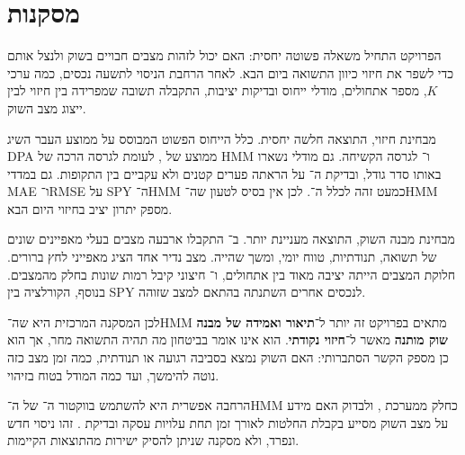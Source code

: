 \section{מסקנות}

הפרויקט התחיל משאלה פשוטה יחסית: האם  יכול לזהות מצבים חבויים בשוק ולנצל אותם כדי לשפר את חיזוי כיוון התשואה ביום הבא. לאחר הרחבת הניסוי לתשעה נכסים, כמה ערכי \(K\), מספר אתחולים, מודלי ייחוס ובדיקות יציבות, התקבלה תשובה שמפרידה בין חיזוי לבין ייצוג מצב השוק.

מבחינת חיזוי, התוצאה חלשה יחסית. כלל הייחוס הפשוט המבוסס על ממוצע העבר השיג DPA ממוצע של , לעומת  לגרסה הרכה של HMM ו־ לגרסה הקשיחה. גם מודלי  נשארו באותו סדר גודל, ובדיקת ה־ על  הראתה פערים קטנים ולא עקביים בין התקופות. גם במדדי MAE ו־RMSE על SPY ה־HMM כמעט זהה לכלל ה־. לכן אין בסיס לטעון שה־HMM מספק יתרון יציב בחיזוי היום הבא.

מבחינת מבנה השוק, התוצאה מעניינת יותר. ב־ התקבלו ארבעה מצבים בעלי מאפיינים שונים של תשואה, תנודתיות, טווח יומי,  ומשך שהייה. מצב נדיר אחד הציג מאפייני לחץ ברורים. חלוקת המצבים הייתה יציבה מאוד בין אתחולים, ו־ חיצוני קיבל רמות שונות בחלק מהמצבים. בנוסף, הקורלציה בין SPY לנכסים אחרים השתנתה בהתאם למצב שזוהה.

לכן המסקנה המרכזית היא שה־HMM מתאים בפרויקט זה יותר ל־\textbf{תיאור ואמידה של מבנה שוק מותנה} מאשר ל־\textbf{חיזוי נקודתי}. הוא אינו אומר בביטחון מה תהיה התשואה מחר, אך הוא כן מספק הקשר הסתברותי: האם השוק נמצא בסביבה רגועה או תנודתית, כמה זמן מצב כזה נוטה להימשך, ועד כמה המודל בטוח בזיהוי.

הרחבה אפשרית היא להשתמש בווקטור ה־ של ה־HMM כחלק ממערכת , ולבדוק האם מידע על מצב השוק מסייע בקבלת החלטות לאורך זמן תחת עלויות עסקה ובדיקת . זהו ניסוי חדש ונפרד, ולא מסקנה שניתן להסיק ישירות מהתוצאות הקיימות.
